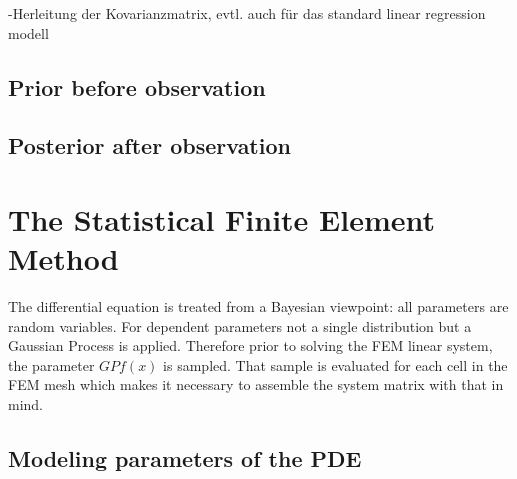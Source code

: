 \documentclass[%
  a4paper,oneside,%
  11pt,%
  smallchapters,
  green,%
  rgb, <cmyk>
  ,]{tubsbook}
\begin{document}
-Herleitung der Kovarianzmatrix, evtl. auch für das standard linear regression modell


\subsection{Prior before observation}

\subsection{Posterior after observation}

\section{The Statistical Finite Element Method}
The differential equation is treated from a Bayesian viewpoint: all parameters are random variables. For dependent parameters not a single distribution but a Gaussian Process is applied. Therefore prior to solving the FEM linear system, the parameter $GP f(x)$ is sampled. That sample is evaluated for each cell in the FEM mesh which makes it necessary to assemble the system matrix with that in mind.

\subsection{Modeling parameters of the PDE}
\end{document}
